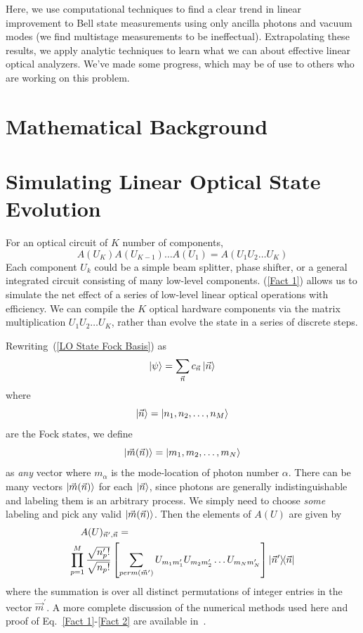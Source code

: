 \documentclass[aps,pra,twocolumn,showpacs,superscriptaddress,floatfix,10pt]{revtex4}
\begin{document}
Here, we use computational techniques to find a clear trend in linear improvement to Bell state measurements using only ancilla photons and vacuum modes (we find multistage measurements to be ineffectual). Extrapolating these results, we apply analytic techniques to learn what we can about effective linear optical analyzers. We've made some progress, which may be of use to others who are working on this problem.
\section{Mathematical Background}

\section{Simulating Linear Optical State Evolution}
\label{Section of Facts}
For an optical circuit of $K$ number of components,
\begin{equation}
	\label{Fact 1}
A(U_K) A(U_{K-1}) \dots A(U_1) = A(U_1 U_2 \dots U_K)
\end{equation}
Each component $U_k$ could be a simple beam splitter, phase shifter, or a general integrated circuit consisting of many low-level components.
(\ref{Fact 1}) allows us to simulate the net effect of a series of low-level linear optical operations with efficiency. We can compile the $K$ optical hardware components via the matrix multiplication $U_1 U_2 \dots U_K$, rather than evolve the state in a series of discrete steps.

Rewriting~(\ref{LO State Fock Basis}) as
\begin{equation}
\label{LO State Fock Vec Basis}
\ket{\psi} = \sum_{\vec{n}} c_{\vec{n}} \ket{\vec{n}}
\end{equation}
where
\begin{equation}
\ket{\vec{n}} = \ket{n_1,n_2,\dots,n_M}
\end{equation}
are the Fock states, we define
\begin{equation}
\label{m definition}
\ket{\vec{m}(\vec{n})} = \ket{m_1,m_2,\dots,m_N}
\end{equation}
as \textit{any} vector where $m_\alpha$ is the mode-location of photon number $\alpha$. There can be many vectors $\ket{\vec{m}(\vec{n})}$ for each $\ket{\vec{n}}$, since photons are generally indistinguishable and labeling them is an arbitrary process. We simply need to choose \textit{some} labeling and pick any valid $\ket{\vec{m}(\vec{n})}$. Then the elements of $A(U)$ are given by
\begin{eqnarray}
\label{Fact 2}
A(U)_{\vec{n}^\prime,\vec{n}} = \quad \quad \quad \quad \quad \quad \quad \quad \quad \quad \quad \quad \quad \quad \quad \quad \quad \\ \small \nonumber \prod_{p=1}^{M} \frac{\sqrt{n_p^\prime !}}{\sqrt{n_p !}} \left[\sum_{perm(\vec{m}^\prime)} U_{m_1 m_1^\prime} U_{m_2 m_2^\prime} \dots U_{m_N m_N^\prime} \right] \outerproduct{\vec{n}^\prime}{\vec{n}} 
\end{eqnarray}
where the summation is over all distinct permutations of integer entries in the vector $\vec{m}^\prime$. A more complete discussion of the numerical methods used here and proof of Eq.~\ref{Fact 1}-\ref{Fact 2} are available in~\cite{Jake Smith}.
\end{document}
